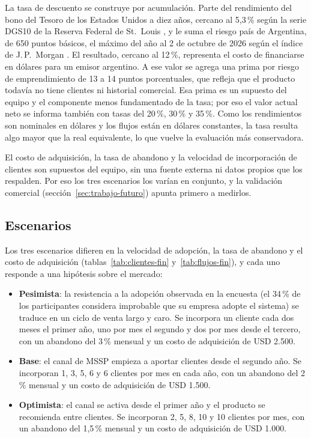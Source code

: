 La tasa de descuento se construye por acumulación. Parte del rendimiento del bono del Tesoro de los
Estados Unidos a diez años, cercano al 5,3\,\% según la serie DGS10 de la Reserva Federal de
St.~Louis \parencite{FRED2026DGS10}, y le suma el riesgo país de Argentina, de 650 puntos básicos,
el máximo del año al 2 de octubre de 2026 según el índice de J.\,P.~Morgan \parencite{MENDEZ2026RiesgoPais}. El resultado,
cercano al 12\,\%, representa el costo de financiarse en dólares para un emisor argentino. A ese valor
se agrega una prima por riesgo de emprendimiento de 13 a 14 puntos porcentuales, que refleja que el
producto todavía no tiene clientes ni historial comercial. Esa prima es un supuesto del equipo y el
componente menos fundamentado de la tasa; por eso el valor actual neto se informa también con tasas del
20\,\%, 30\,\% y 35\,\%. Como los rendimientos son nominales en dólares y los flujos están en dólares
constantes, la tasa resulta algo mayor que la real equivalente, lo que vuelve la evaluación más
conservadora.

El costo de adquisición, la tasa de abandono y la velocidad de incorporación de clientes son supuestos del equipo, sin una fuente externa ni datos propios que los respalden. Por eso los tres escenarios los varían en conjunto, y la validación comercial (sección~\ref{sec:trabajo-futuro}) apunta primero a medirlos.

\subsection{Escenarios}\label{sec:escenarios-fin}
Los tres escenarios difieren en la velocidad de adopción, la tasa de abandono y el costo de
adquisición (tablas~\ref{tab:clientes-fin} y~\ref{tab:flujos-fin}), y cada uno responde a una
hipótesis sobre el mercado:
\begin{itemize}
  \item \textbf{Pesimista}: la resistencia a la adopción observada en la encuesta (el 34\,\% de los
        participantes considera improbable que su empresa adopte el sistema) se traduce en un ciclo
        de venta largo y caro. Se incorpora un cliente cada dos meses el primer año, uno por mes el segundo y dos por mes desde el tercero, con un abandono del 3\,\% mensual y un costo de adquisición de USD 2.500.
  \item \textbf{Base}: el canal de MSSP empieza a aportar clientes desde el segundo año. Se
        incorporan 1, 3, 5, 6 y 6 clientes por mes en cada año, con un abandono del 2\,\% mensual y
        un costo de adquisición de USD 1.500.
  \item \textbf{Optimista}: el canal se activa desde el primer año y el producto se recomienda entre
        clientes. Se incorporan 2, 5, 8, 10 y 10 clientes por mes, con un abandono del 1,5\,\% mensual
        y un costo de adquisición de USD 1.000.
\end{itemize}

